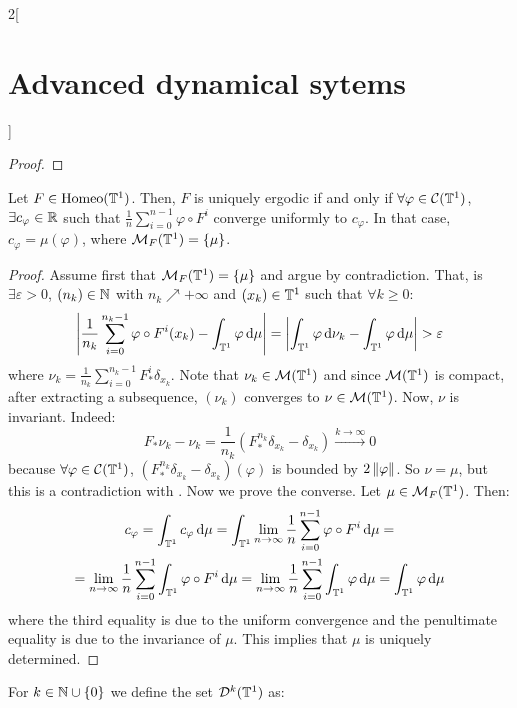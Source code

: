 \documentclass[../../../main_math.tex]{subfiles}
\begin{document}
\begin{multicols}{2}[\section{Advanced dynamical sytems}]
\begin{proof}
  \end{proof}
  \begin{proposition}\label{ADS:birkov_sum_converge}
    Let $F\in \mathrm{Homeo}(\mathbb{T}^1)$. Then, $F$ is uniquely ergodic if and only if $\forall \varphi\in\mathcal{C}(\mathbb{T}^1)$, $\exists c_\varphi\in\mathbb{R}$ such that $\frac{1}{n}\sum_{i=0}^{n-1}\varphi\circ F^i$ converge uniformly to $c_\varphi$. In that case, $c_\varphi=\mu(\varphi)$, where $\mathcal{M}_F(\mathbb{T}^1)=\{\mu\}$.
  \end{proposition}
  \begin{proof}
    Assume first that $\mathcal{M}_F(\mathbb{T}^1)=\{\mu\}$ and argue by contradiction. That, is $\exists \varepsilon>0$, $(n_k)\in\mathbb{N}$ with $n_k\nearrow +\infty$ and $(x_k)\in\mathbb{T}^1$ such that $\forall k\geq 0$:
    \begin{equation}\label{ADS:nuk_mu}
      \abs{\frac{1}{n_k}\sum_{i=0}^{n_k-1}\varphi\circ F^i(x_k)-\int_{\mathbb{T}^1}\varphi\dd{\mu}}=\abs{\int_{\mathbb{T}^1}\varphi\dd{\nu_k}-\int_{\mathbb{T}^1}\varphi\dd{\mu}}>\varepsilon
    \end{equation}
    $$
    $$
    where $\nu_k=\frac{1}{n_k}\sum_{i=0}^{n_k-1}F_*^i\delta_{x_k}$. Note that $\nu_k\in\mathcal{M}(\mathbb{T}^1)$ and since $\mathcal{M}(\mathbb{T}^1)$ is compact, after extracting a subsequence, $(\nu_k)$ converges to $\nu\in\mathcal{M}(\mathbb{T}^1)$. Now, $\nu$ is invariant. Indeed:
    $$
      F_*\nu_k-\nu_k=\frac{1}{n_k}(F_*^{n_k}\delta_{x_k}-\delta_{x_k})\overset{k\to\infty}{\longrightarrow} 0
    $$
    because $\forall \varphi\in\mathcal{C}(\mathbb{T}^1)$, $(F_*^{n_k}\delta_{x_k}-\delta_{x_k})(\varphi)$ is bounded by $2\left\|\varphi\right\|$. So $\nu =\mu$, but this is a contradiction with . Now we prove the converse. Let $\mu\in\mathcal{M}_F(\mathbb{T}^1)$. Then:
    \begin{multline*}
      c_\varphi =\int_{\mathbb{T}^1}c_\varphi\dd{\mu} =\int_{\mathbb{T}^1}\lim_{n\to\infty}\frac{1}{n}\sum_{i=0}^{n-1}\varphi\circ F^i\dd{\mu} =\\
      =\lim_{n\to\infty}\frac{1}{n}\sum_{i=0}^{n-1}\int_{\mathbb{T}^1}\varphi\circ F^i\dd{\mu}=\lim_{n\to\infty}\frac{1}{n}\sum_{i=0}^{n-1}\int_{\mathbb{T}^1}\varphi\dd{\mu} =\int_{\mathbb{T}^1}\varphi\dd{\mu}
    \end{multline*}
    where the third equality is due to the uniform convergence and the penultimate equality is due to the invariance of $\mu$. This implies that $\mu$ is uniquely determined.
  \end{proof}
  \begin{definition}
    For $k\in\mathbb{N}\cup\{0\}$ we define the set $\mathcal{D}^k(\mathbb{T}^1)$ as:

\end{definition}
\end{multicols}
\end{document}
